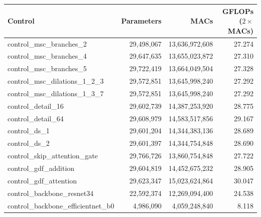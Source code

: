 \begin{tabular}{lrrr}
\hline
Control & Parameters & MACs & GFLOPs ($2\times$MACs) \\
\hline
control\_msc\_branches\_2 & 29,498,067 & 13,636,972,608 & 27.274 \\
control\_msc\_branches\_4 & 29,647,635 & 13,655,023,872 & 27.310 \\
control\_msc\_branches\_5 & 29,722,419 & 13,664,049,504 & 27.328 \\
control\_msc\_dilations\_1\_2\_3 & 29,572,851 & 13,645,998,240 & 27.292 \\
control\_msc\_dilations\_1\_3\_7 & 29,572,851 & 13,645,998,240 & 27.292 \\
control\_detail\_16 & 29,602,739 & 14,387,253,920 & 28.775 \\
control\_detail\_64 & 29,608,979 & 14,583,517,856 & 29.167 \\
control\_ds\_1 & 29,601,204 & 14,344,383,136 & 28.689 \\
control\_ds\_2 & 29,601,397 & 14,344,754,848 & 28.690 \\
control\_skip\_attention\_gate & 29,766,726 & 13,860,754,848 & 27.722 \\
control\_gdf\_addition & 29,604,819 & 14,452,675,232 & 28.905 \\
control\_gdf\_attention & 29,623,347 & 15,023,624,864 & 30.047 \\
control\_backbone\_resnet34 & 22,592,374 & 12,269,094,400 & 24.538 \\
control\_backbone\_efficientnet\_b0 & 4,986,090 & 4,059,248,840 & 8.118 \\
\hline
\end{tabular}
